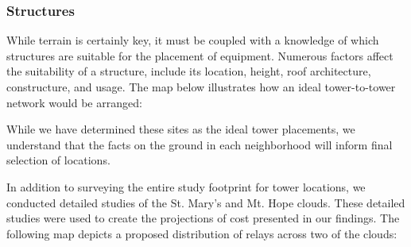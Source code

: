 \subsubsection{Structures}
While terrain is certainly key, it must be coupled with a knowledge of which structures are
suitable for the placement of equipment. Numerous factors affect the suitability of a structure,
include its location, height, roof architecture, constructure, and usage.
The map below illustrates how an ideal tower-to-tower network would be arranged:
\begin{center}
\end{center}
While we have determined these sites as the ideal tower placements, we
understand that the facts on the ground in each neighborhood will inform final selection of
locations.\par
In addition to surveying the entire study footprint for tower locations, we conducted detailed
studies of the St. Mary's and Mt. Hope clouds. These detailed studies were used to create the
projections of cost presented in our findings. The following map depicts a proposed distribution
of relays across two of the clouds:
\begin{center}
\end{center}

